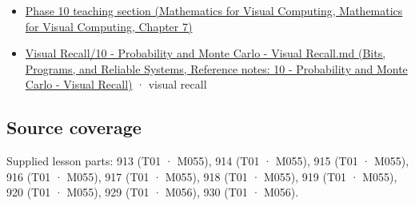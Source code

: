 \begin{itemize}
\tightlist
\item
  \href{../02-Mathematics-for-Visual-Computing/main.pdf\#nameddest=02-foundations-ii-ch023-expected-values-describe-centers-covariance-describes-dependence}{Phase 10 teaching section (Mathematics for Visual Computing, Mathematics for Visual Computing, Chapter 7)}
\item
  \href{../01-Bits-Programs-and-Reliable-Systems/main.pdf\#nameddest=appendix-cb5af353ef77}{Visual Recall/10 - Probability and Monte Carlo - Visual Recall.md (Bits, Programs, and Reliable Systems, Reference notes: 10 - Probability and Monte Carlo - Visual Recall)} · visual recall
\end{itemize}

\subsection{Source coverage}\label{appendix-54c383df9992-source-coverage}

Supplied lesson parts: 913 (T01 · M055), 914 (T01 · M055), 915 (T01 · M055), 916 (T01 · M055), 917 (T01 · M055), 918 (T01 · M055), 919 (T01 · M055), 920 (T01 · M055), 929 (T01 · M056), 930 (T01 · M056).
